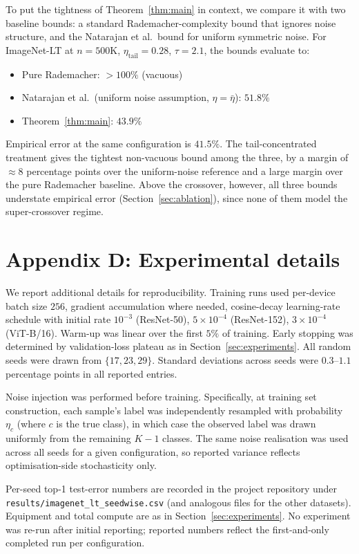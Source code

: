 \documentclass[11pt]{article}
\begin{document}
To put the tightness of Theorem~\ref{thm:main} in context, we compare it with two baseline bounds: a standard Rademacher-complexity bound that ignores noise structure, and the Natarajan et al.\ bound for uniform symmetric noise. For ImageNet-LT at $n = 500\text{K}$, $\eta_{\mathrm{tail}} = 0.28$, $\tau = 2.1$, the bounds evaluate to:
\begin{itemize}
\item Pure Rademacher: $>100\%$ (vacuous)
\item Natarajan et al.\ (uniform noise assumption, $\eta = \bar{\eta}$): $51.8\%$
\item Theorem~\ref{thm:main}: $43.9\%$
\end{itemize}
Empirical error at the same configuration is $41.5\%$. The tail-concentrated treatment gives the tightest non-vacuous bound among the three, by a margin of $\approx 8$ percentage points over the uniform-noise reference and a large margin over the pure Rademacher baseline. Above the crossover, however, all three bounds understate empirical error (Section~\ref{sec:ablation}), since none of them model the super-crossover regime.

\section{Appendix D: Experimental details}  \label{app:details}

We report additional details for reproducibility. Training runs used per-device batch size $256$, gradient accumulation where needed, cosine-decay learning-rate schedule with initial rate $10^{-3}$ (ResNet-50), $5 \times 10^{-4}$ (ResNet-152), $3 \times 10^{-4}$ (ViT-B/16). Warm-up was linear over the first $5\%$ of training. Early stopping was determined by validation-loss plateau as in Section~\ref{sec:experiments}. All random seeds were drawn from $\{17, 23, 29\}$. Standard deviations across seeds were $0.3$--$1.1$ percentage points in all reported entries.

Noise injection was performed before training. Specifically, at training set construction, each sample's label was independently resampled with probability $\eta_c$ (where $c$ is the true class), in which case the observed label was drawn uniformly from the remaining $K-1$ classes. The same noise realisation was used across all seeds for a given configuration, so reported variance reflects optimisation-side stochasticity only.

Per-seed top-1 test-error numbers are recorded in the project repository under \texttt{results/imagenet\_lt\_seedwise.csv} (and analogous files for the other datasets). Equipment and total compute are as in Section~\ref{sec:experiments}. No experiment was re-run after initial reporting; reported numbers reflect the first-and-only completed run per configuration.
\end{document}
